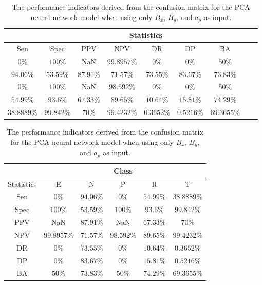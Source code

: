 \begin{table}[!ht]
	\centering
	\begin{tabular}{|c|c|c|c|c|c|c|c|c|}
		\hline
		 & \multicolumn{7}{c|}{Statistics} \\ \hline
		Sen & Spec & PPV & NPV & DR & DP & BA \\ \hline
		$0\%$ & $100\%$ & NaN & $99.8957\%$ & $0\%$ & $0\%$ & $50\%$ \\ \hline
		$94.06\%$ & $53.59\%$ & $87.91\%$ & $71.57\%$ & $73.55\%$ & $83.67\%$ & $73.83\%$ \\ \hline
		$0\%$ & $100\%$ & NaN & $98.592\%$ & $0\%$ & $0\%$ & $50\%$ \\ \hline
		$54.99\%$ & $93.6\%$ & $67.33\%$ & $89.65\%$ & $10.64\%$ & $15.81\%$ & $74.29\%$ \\ \hline
		$38.8889\%$ & $99.842\%$ & $70\%$ & $99.4232\%$ & $0.3652\%$ & $0.5216\%$ & $69.3655\%$ \\ \hline
	\end{tabular}
	\caption{The performance indicators derived from the confusion matrix for the PCA neural network model when using only $B_{x}$, $B_{y}$, and $a_{p}$ as input.}
	\label{tab:cs:xyap:pcaNNet}
\end{table}

\begin{table}[!ht]
	\centering
	\begin{tabular}{|c|c|c|c|c|c|}
		\hline
		 & \multicolumn{5}{c|}{Class} \\ \hline
		Statistics & E & N & P & R & T \\ \hline
		Sen & $0\%$ & $94.06\%$ & $0\%$ & $54.99\%$ & $38.8889\%$ \\ \hline
		Spec & $100\%$ & $53.59\%$ & $100\%$ & $93.6\%$ & $99.842\%$ \\ \hline
		PPV & NaN & $87.91\%$ & NaN & $67.33\%$ & $70\%$ \\ \hline
		NPV & $99.8957\%$ & $71.57\%$ & $98.592\%$ & $89.65\%$ & $99.4232\%$ \\ \hline
		DR & $0\%$ & $73.55\%$ & $0\%$ & $10.64\%$ & $0.3652\%$ \\ \hline
		DP & $0\%$ & $83.67\%$ & $0\%$ & $15.81\%$ & $0.5216\%$ \\ \hline
		BA & $50\%$ & $73.83\%$ & $50\%$ & $74.29\%$ & $69.3655\%$ \\ \hline
	\end{tabular}
	\caption{The performance indicators derived from the confusion matrix for the PCA neural network model when using only $B_{x}$, $B_{y}$, and $a_{p}$ as input.}
	\label{tab:cs:reverse:xyap:pcaNNet}
\end{table}

